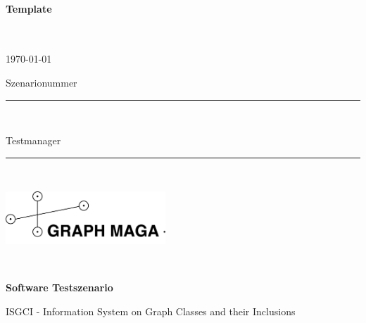 

\paragraph{Template} \ \\



\thispagestyle{empty} %


\begin{minipage}[l]{0.6\textwidth}
{\large \today}\\

{\large Szenarionummer \rule{1cm}{0.4pt}}\\

{\large Testmanager \rule{4cm}{0.4pt}}\\

\end{minipage}
\begin{minipage}{0.4\textwidth}
\includegraphics*[width=6cm]{Logo.png}
\end{minipage}\\


\vspace*{1cm} 
\begin{center}
\textbf{{\LARGE Software Testszenario}}\\
\end{center}

\begin{center}
{\large ISGCI - Information System on Graph Classes and their Inclusions}\\
\end{center}


$ $\\


	$ $\\

